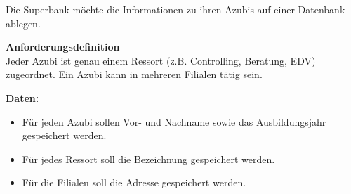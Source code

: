 \documentclass[a4paper,12pt, headsepline, ngerman]{scrartcl}
\begin{document}
	\begin{Exercise}[title={Erstelle ein ERM zu folgendem Sachverhalt. (9P)}, label=KAERMAufstellen]

		Die Superbank möchte die Informationen zu ihren Azubis auf einer Datenbank ablegen.

		\textbf{Anforderungsdefinition}\\
		Jeder Azubi ist genau einem Ressort (z.B. Controlling, Beratung, EDV) zugeordnet. Ein Azubi kann in mehreren Filialen tätig sein.

		\textbf{Daten:}
		\begin{itemize}
			\item Für jeden Azubi sollen Vor- und Nachname sowie das Ausbildungsjahr gespeichert werden.
			\item Für jedes Ressort soll die Bezeichnung gespeichert werden.
			\item Für die Filialen soll die Adresse gespeichert werden.
		\end{itemize}
	\end{Exercise}%
\end{document}
